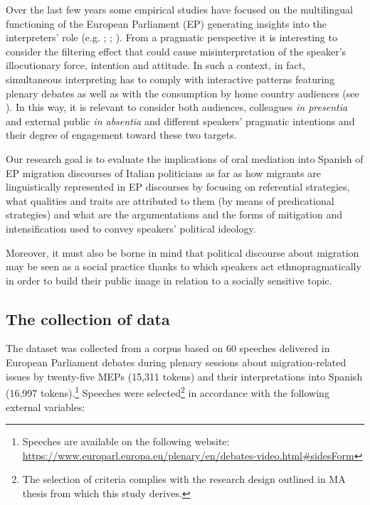 \documentclass[output=paper]{langscibook}
\begin{document}
Over the last few years some empirical studies have focused on the multilingual functioning of the European Parliament (EP) generating insights into the interpreters’ role (e.g. \citealt{Bartlomiejczyk2016}; \citealt{BeatonThome2013}; \citealt{KucisMajhenic2018}). From a pragmatic perspective it is interesting to consider the filtering effect that could cause misinterpretation of the speaker’s illocutionary force, intention and attitude. In such a context, in fact, simultaneous interpreting has to comply with interactive patterns featuring plenary debates as well as with the consumption by home country audiences (see \citealt[57]{Kent2009}). In this way, it is relevant to consider both audiences, colleagues \textit{in presentia} and external public \textit{in absentia} and different speakers’ pragmatic intentions and their degree of engagement toward these two targets.

Our research goal is to evaluate the implications of oral mediation into Spanish of EP migration discourses of Italian politicians as far as how migrants are linguistically represented in EP discourses by focusing on referential strategies, what qualities and traits are attributed to them (by means of predicational strategies) and what are the argumentations and the forms of mitigation and intensification used to convey speakers’ political ideology. 

Moreover, it must also be borne in mind that political discourse about migration may be seen as a social practice thanks to which speakers act ethnopragmatically in order to build their public image in relation to a socially sensitive topic.


\subsection{The collection of data} \label{sec:mori:3.2}

The dataset was collected from a corpus based on 60 speeches delivered in European Parliament debates during plenary sessions about migration-related issues by twenty-five MEPs (15,311 tokens) and their interpretations into Spanish (16,997 tokens).\footnote{Speeches are available on the following website: \url{https://www.europarl.europa.eu/plenary/en/debates-video.html\#sidesForm}} Speeches were selected\footnote{The selection of criteria complies with the research design outlined in  MA thesis from which this study derives.} in accordance with the following external variables:
\end{document}
